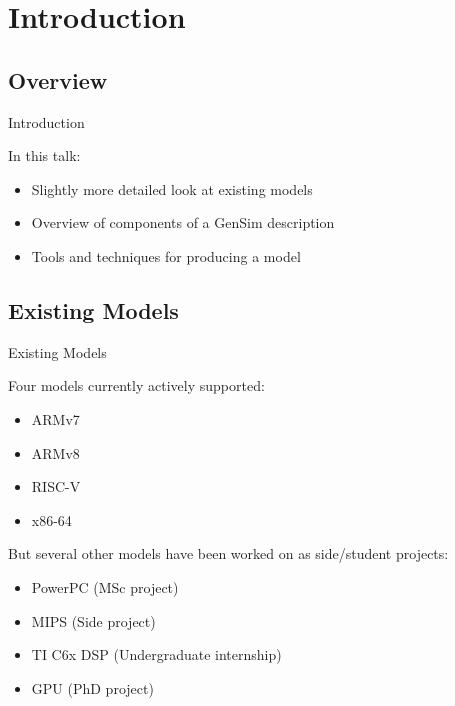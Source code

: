 \section{Introduction}
\subsection{Overview}
\begin{frame}{Introduction}

In this talk:
\begin{itemize}
\item Slightly more detailed look at existing models
\item Overview of components of a GenSim description
\item Tools and techniques for producing a model
\end{itemize}

\end{frame}

\begin{frame}
	\tableofcontents
\end{frame}	

\subsection{Existing Models}

\begin{frame}{Existing Models}

Four models currently actively supported:

\begin{itemize}
\item ARMv7
\item ARMv8
\item RISC-V
\item x86-64
\end{itemize}

\pause

But several other models have been worked on as side/student projects:

\begin{itemize}
\item PowerPC (MSc project)
\item MIPS (Side project)
\item TI C6x DSP (Undergraduate internship)
\item GPU (PhD project)
\end{itemize}
\end{frame}

